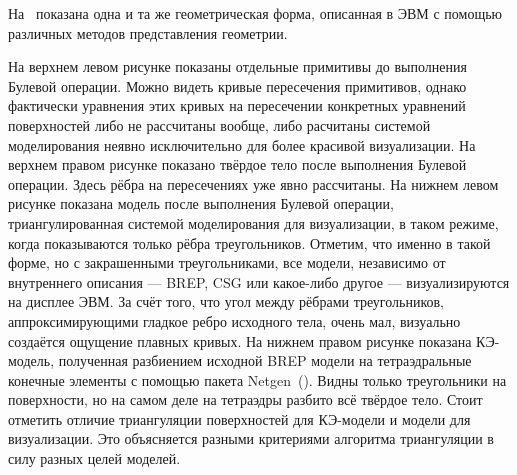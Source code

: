 На~ показана одна и та же геометрическая форма, описанная в ЭВМ с помощью различных методов представления геометрии.

На верхнем левом рисунке показаны отдельные примитивы до выполнения Булевой операции. Можно видеть кривые пересечения примитивов, однако фактически уравнения этих кривых на пересечении конкретных уравнений поверхностей либо не рассчитаны вообще, либо расчитаны системой моделирования неявно исключительно для более красивой визуализации.
На верхнем правом рисунке показано твёрдое тело после выполнения Булевой операции. Здесь рёбра на пересечениях уже явно рассчитаны.
На нижнем левом рисунке показана модель после выполнения Булевой операции, триангулированная системой моделирования для визуализации, в таком режиме, когда показываются только рёбра треугольников. Отметим, что именно в такой форме, но с закрашенными треугольниками, все модели, независимо от внутреннего описания --- BREP, CSG или какое-либо другое --- визуализируются на дисплее ЭВМ. За счёт того, что угол между рёбрами треугольников, аппроксимирующими гладкое ребро исходного тела, очень мал, визуально создаётся ощущение плавных кривых.
На нижнем правом рисунке показана КЭ-модель, полученная разбиением исходной BREP модели на тетраэдральные конечные элементы с помощью пакета Netgen~(\cite{NETGEN}). Видны только треугольники на поверхности, но на самом деле на тетраэдры разбито всё твёрдое тело.
Стоит отметить отличие триангуляции поверхностей для КЭ-модели и модели для визуализации. Это объясняется разными критериями алгоритма триангуляции в силу разных целей моделей.

